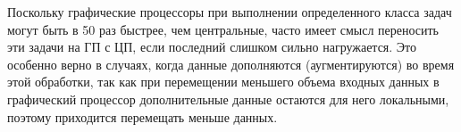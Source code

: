 \documentclass[%
	11pt,
	a4paper,
	utf8,
		]{article}
\begin{document}
Поскольку графические процессоры при выполнении определенного класса задач могут быть в 50 раз быстрее, чем центральные, часто имеет смысл переносить эти задачи на ГП с ЦП, если последний слишком сильно нагружается. Это особенно верно в случаях, когда данные дополняются (аугментируются) во время этой обработки, так как при перемещении меньшего объема входных данных в графический процессор дополнительные данные остаются для него локальными, поэтому приходится перемещать меньше данных.






\begin{thebibliography}{99}
	
\end{thebibliography}


\end{document}

